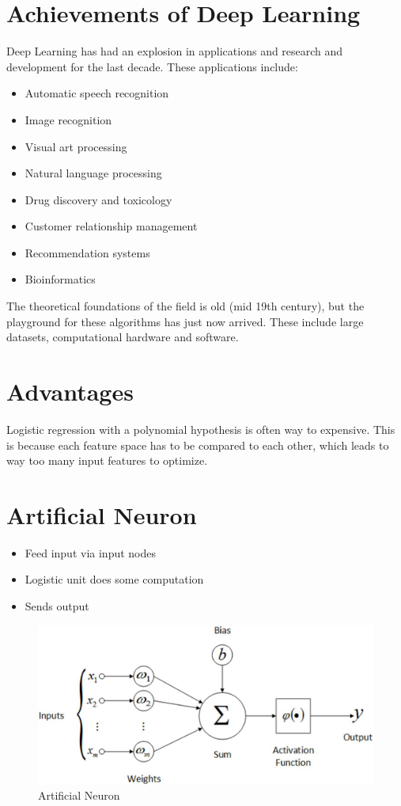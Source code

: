 \section{Achievements of Deep Learning}
Deep Learning has had an explosion in applications and research and development
for the last decade. These applications include:

\begin{itemize}
    \item Automatic speech recognition
    \item Image recognition
    \item Visual art processing
    \item Natural language processing
    \item Drug discovery and toxicology
    \item Customer relationship management
    \item Recommendation systems
    \item Bioinformatics
\end{itemize}

The theoretical foundations of the field is old (mid 19th century), but the 
playground for these algorithms has just now arrived. These include large
datasets, computational hardware and software. 




\section{Advantages}
Logistic regression with a polynomial hypothesis is often way to expensive. This is because each feature space has to be compared to each other, which leads to way too many input features to optimize.

\section{Artificial Neuron}
\begin{itemize}
    \item Feed input via input nodes
    \item Logistic unit does some computation
    \item Sends output
\end{itemize}

\bigskip
\begin{figure}[H]
\centering
\includegraphics[scale=0.25]{figures/artificialneuron.jpeg}
\caption{Artificial Neuron}
\end{figure}


